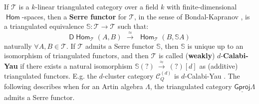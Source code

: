 \documentclass[oneside, a4paper,reqno]{amsart}
\numberwithin{equation}{section}
\theoremstyle{definition}
\begin{document}
If ${\mathcal T}$ is a $k$-linear triangulated category over a field $k$ with
finite-dimensional $\operatorname{\mathsf{Hom}}$-spaces, then a {\bf  Serre functor} for
${\mathcal T}$, in the sense of Bondal-Kapranov \cite{BondalKapranov}, is a
triangulated equivalence $\mathbb S : {\mathcal T} {\longrightarrow} {\mathcal T}$ such that:
\[
\mathsf{D}\operatorname{\mathsf{Hom}}_{\mathcal T}(A,B) \,\ \stackrel{\approx}{\longrightarrow} \,\
\operatorname{\mathsf{Hom}}_{\mathcal T}(B,\mathbb S A)
\]
naturally $\forall A, B \in {\mathcal T}$. If ${\mathcal T}$ admits a Serre functor
$\mathbb S$, then $\mathbb S$ is unique up to an isomorphism of
triangulated functors, and then ${\mathcal T}$ is called ({\bf weakly})
$d$-{\bf Calabi-Yau} if there exists a natural isomorphism $\mathbb
S(?) \ \stackrel{\approx}{\longrightarrow} \ (?)[d]$ as (additive) triangulated
functors. E.g. the $d$-cluster category ${\mathscr C}^{(d)}_{Q}$ is
$d$-Calabi-Yau \cite{Keller:orbit}. The following describes when for
an Artin algebra $\Lambda$, the triangulated category
${\operatorname{\underline{\mathsf{Gproj}}}\nolimits}\Lambda$ admits a Serre functor.
\end{document}

